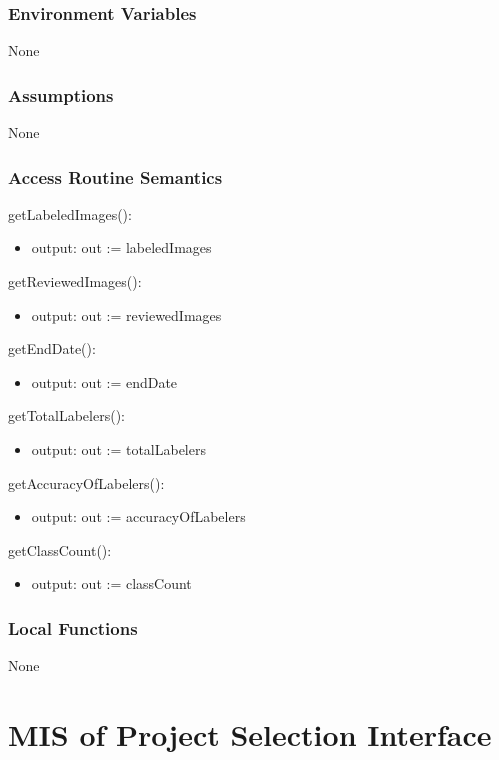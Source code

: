\documentclass[12pt, titlepage]{article}
\begin{document}
\subsubsection{Environment Variables}
None

\subsubsection{Assumptions}
None

\subsubsection{Access Routine Semantics}

\noindent getLabeledImages():
\begin{itemize}
\item output: out := labeledImages
\end{itemize}

\noindent getReviewedImages():
\begin{itemize}
\item output: out := reviewedImages
\end{itemize}

\noindent getEndDate():
\begin{itemize}
\item output: out := endDate
\end{itemize}

\noindent getTotalLabelers():
\begin{itemize}
\item output: out := totalLabelers
\end{itemize}

\noindent getAccuracyOfLabelers():
\begin{itemize}
\item output: out := accuracyOfLabelers
\end{itemize}

\noindent getClassCount():
\begin{itemize}
\item output: out := classCount
\end{itemize}

\subsubsection{Local Functions}
None

\section{MIS of Project Selection Interface} \label{psi}
\end{document}
